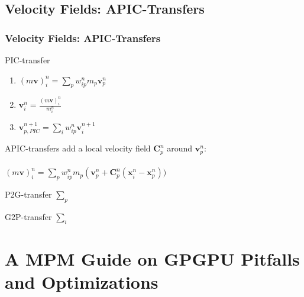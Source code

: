 \documentclass{beamer}
\begin{document}
  \subsection{Velocity Fields: APIC-Transfers}
\begin{frame}
  \frametitle{Velocity Fields: APIC-Transfers}
  \begin{minipage}{0.64\textwidth}
  PIC-transfer
  \begin{enumerate}
    \item $(m\boldsymbol{v})_i^n = \sum_p w_{ip}^nm_p\boldsymbol{v}^n_p$
    \item $\boldsymbol{v}_i^n = \frac{(m\boldsymbol{v})_i^n}{m_i^n}$
    \item $\boldsymbol{v}_{p,{PIC}}^{n+1} = \sum_i w^n_{ip}\boldsymbol{v}_i^{n+1}$
  \end{enumerate}
\vspace*{15}
APIC-transfers add a local velocity field $\boldsymbol{C}^n_p$ around $\boldsymbol{v}^n_p$:
\\\vspace*{-10}\\
$ ( m \boldsymbol{v} ) _ { i } ^ { n } = \sum _ { p } w _ { i p } ^ { n } m _ { p } \left( \boldsymbol{v} _ { p } ^ { n } + \boldsymbol{C} _ { p } ^ { n } ( \boldsymbol{x} _ { i } ^ { n } - \boldsymbol{x} _ { p } ^ { n }))$
\end{minipage}
\begin{minipage}{0.30\textwidth}
\begin{minipage}{1.0\textwidth}
  \small
  
  P2G-transfer $\sum_p$
\\
\end{minipage}
\begin{minipage}{1.0\textwidth}
  \small
  
  G2P-transfer $\sum_i$
\end{minipage}
\end{minipage}
\end{frame}
\section{A MPM Guide on GPGPU Pitfalls and Optimizations}
\end{document}
